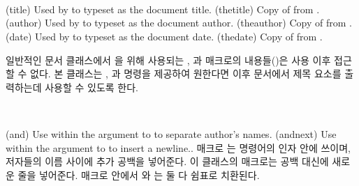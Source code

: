 \begin{syntax}
\cmd{\title} \cmd{\thetitle} \\
\cmd{\author} \cmd{\theauthor} \\
\cmd{\date} \cmd{\thedate} \\
\end{syntax}
\glossary(title)
  {}%
  {Used by  to typeset  as the document  title.}
\glossary(thetitle)
  {}%
  {Copy of  from .}
\glossary(author)
  {}%
  {Used by  to typeset  as the document author.}
\glossary(theauthor)
  {}%
  {Copy of  from .}
\glossary(date)
  {}%
  {Used by  to typeset  as the document date.}
\glossary(thedate)
  {}%
  {Copy of  from .}

일반적인 문서 클래스에서 \cmd{\maketitle}을 위해 사용되는 \cmd{\title},
\cmd{\author}과  매크로의 내용들()은 \cmd{\maketitle} 사용
이후 접근할 수 없다.
본 클래스는 \cmd{\thetitle}, \cmd{\theauthor}과 \cmd{\thedate} 명령을 제공하여
원한다면 이후 문서에서 제목 요소를 출력하는데 사용할 수 있도록 한다.

\begin{syntax}
\cmd{\and} \cmd{\andnext} \\
\end{syntax}
\glossary(and)%
  {}%
  {Use within the argument to  to separate author's names.}
\glossary(andnext)%
  {}%
  {Use within the argument to  to insert a newline..}
매크로 \cmd{\and}는 \cmd{\author} 명령어의 인자 안에 쓰이며, 저자들의 이름
사이에 추가 공백을 넣어준다.
이 클래스의 \cmd{\andnext} 매크로는 공백 대신에 새로운 줄을 넣어준다.
\cmd{\theauthor} 매크로 안에서 \cmd{\and}와 \cmd{\andnext}는 둘 다 쉼표로
치환된다.

